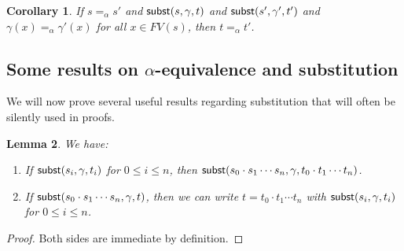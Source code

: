 \documentclass{lmcs}
\theoremstyle{theorem}\newtheorem{theorem}{Theorem}
\theoremstyle{theorem}\newtheorem{lemma}[theorem]{Lemma}
\theoremstyle{theorem}\newtheorem{corollary}[theorem]{Corollary}
\theoremstyle{definition}\newtheorem{definition}[theorem]{Definition}
\theoremstyle{definition}\newtheorem{example}[theorem]{Example}
\newcommand{\FV}{\mathit{FV}}
\begin{document}
\begin{corollary}\label{cor:substitutionalpha}
If $s =_\alpha s'$ and $\mathsf{subst}(s,\gamma,t)$ and $\mathsf{subst}(s',\gamma',t')$ and
  $\gamma(x) =_\alpha \gamma'(x)$ for all $x \in \FV(s)$, then $t =_\alpha t'$.
\end{corollary}

\subsection{Some results on $\alpha$-equivalence and substitution}

We will now prove several useful results regarding substitution that will often
be silently used in proofs.

\begin{lemma}\label{lem:appsubstitute}
We have:
\begin{enumerate}
\item
  If $\mathsf{subst}(s_i,\gamma,t_i)$ for $0 \leq i \leq n$, then $\mathsf{subst}(s_0 \cdot
  s_1 \cdots s_n,\gamma,t_0 \cdot t_1 \cdots t_n)$.
\item
  If $\mathsf{subst}(s_0 \cdot s_1 \cdots s_n,\gamma,t)$, then we can write $t = t_0 \cdot t_1 \cdots t_n$
  with $\mathsf{subst}(s_i,\gamma,t_i)$ for $0 \leq i \leq n$.
\end{enumerate}
\end{lemma}

\begin{proof}
Both sides are immediate by definition.
\end{proof}
\end{document}
